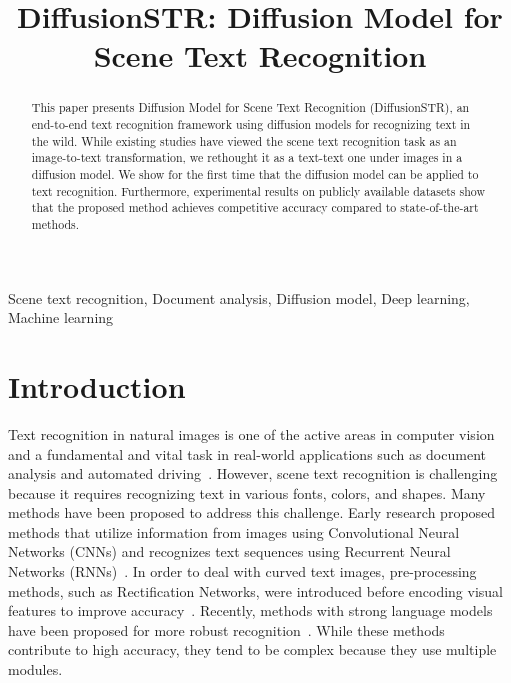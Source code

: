 \documentclass{article}
\title{DiffusionSTR: Diffusion Model for Scene Text Recognition}
\begin{document}
\maketitle


\begin{abstract}
    This paper presents Diffusion Model for Scene Text Recognition  (DiffusionSTR), an end-to-end text recognition framework using diffusion models for recognizing text in the wild.
While existing studies have viewed the scene text recognition task as an image-to-text transformation, we rethought it as a text-text one under images in a diffusion model.
We show for the first time that the diffusion model can be applied to text recognition.
Furthermore, experimental results on publicly available datasets show that the proposed method achieves competitive accuracy compared to state-of-the-art methods.
 \end{abstract}
\begin{keywords}
Scene text recognition, Document analysis, Diffusion model,  Deep learning,  Machine learning 
\end{keywords}



\section{Introduction}
\label{sec:intro}
Text recognition in natural images is one of the active areas in computer vision and a fundamental and vital task in real-world applications such as document analysis and automated driving~\cite{fujitake2021tcbam, fujitake2023a3s}.
However, scene text recognition is challenging because it requires recognizing text in various fonts, colors, and shapes.
Many methods have been proposed to address this challenge.
Early research proposed methods that utilize information from images using Convolutional Neural Networks (CNNs) and recognizes text sequences using Recurrent Neural Networks (RNNs)~\cite{shi2016crnn}.
In order to deal with curved text images, pre-processing methods, such as Rectification Networks, were introduced before encoding visual features to improve accuracy~\cite{baek2021TRBA}.
Recently, methods with strong language models have been proposed for more robust recognition~\cite{fang2021ABINet, bautista2022parseq}.
While these methods contribute to high accuracy, they tend to be complex because they use multiple modules.
\end{document}
